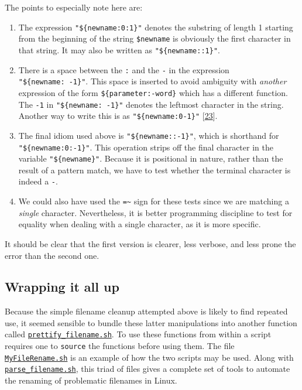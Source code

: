 \documentclass[
  a4paper,
]{article}
\begin{document}
The points to especially note here are:

\begin{enumerate}
\def\labelenumi{(\alph{enumi})}
\item
  The expression \texttt{"\$\{newname:0:1\}"} denotes the substring of
  length 1 starting from the beginning of the string \texttt{\$newname}
  is obviously the first character in that string. It may also be
  written as \texttt{"\$\{newname::1\}"}.
\item
  There is a space between the \texttt{:} and the \texttt{-} in the
  expression \texttt{"\$\{newname:\ -1\}"}. This space is inserted to
  avoid ambiguity with \emph{another} expression of the form
  \texttt{\$\{parameter:-word\}} which has a different function. The
  \texttt{-1} in \texttt{"\$\{newname:\ -1\}"} denotes the leftmost
  character in the string. Another way to write this is as
  \texttt{"\$\{newname:0-1\}"}
  {[}\protect\hyperlink{ref-lastchar}{23}{]}.
\item
  The final idiom used above is \texttt{"\$\{newname::-1\}"}, which is
  shorthand for \texttt{"\$\{newname:0:-1\}"}. This operation strips off
  the final character in the variable \texttt{"\$\{newname\}"}. Because
  it is positional in nature, rather than the result of a pattern match,
  we have to test whether the terminal character is indeed a \texttt{-}.
\item
  We could also have used the \texttt{=\textasciitilde{}} sign for these
  tests since we are matching a \emph{single} character. Nevertheless,
  it is better programming discipline to test for equality when dealing
  with a single character, as it is more specific.
\end{enumerate}

It should be clear that the first version is clearer, less verbose, and
less prone the error than the second one.

\hypertarget{wrapping-it-all-up}{%
\subsection{Wrapping it all up}\label{wrapping-it-all-up}}

Because the simple filename cleanup attempted above is likely to find
repeated use, it seemed sensible to bundle these latter manipulations
into another function called
\href{scripts/prettify_filename.sh}{\texttt{prettify\_filename.sh}}. To
use these functions from within a script requires one to \texttt{source}
the functions before using them. The file
\href{scripts/MyFileRename.sh}{\texttt{MyFileRename.sh}} is an example
of how the two scripts may be used. Along with
\href{scripts/parse_filename.sh}{\texttt{parse\_filename.sh}}, this
triad of files gives a complete set of tools to automate the renaming of
problematic filenames in Linux.
\end{document}
